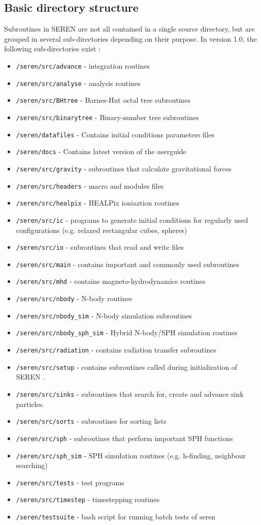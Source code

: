 \documentclass[a4paper]{article}
\newcommand{\var}[1]{\texttt{#1}}
\begin{document}
\subsection{Basic directory structure}
Subroutines in SEREN are not all contained in a single source directory, 
but are grouped in several sub-directories depending on their purpose. 
In version 1.0, the following sub-directories exist : 
\begin{itemize}
\item \var{/seren/src/advance} - integration routines
\item \var{/seren/src/analyse} - analysis routines
\item \var{/seren/src/BHtree} - Barnes-Hut octal tree subroutines
\item \var{/seren/src/binarytree} - Binary-number tree subroutines
\item \var{/seren/datafiles} - Contains initial conditions parameters files
\item \var{/seren/docs} - Contains latest version of the userguide
\item \var{/seren/src/gravity} - subroutines that calculate gravitational forces
\item \var{/seren/src/headers} - macro and modules files
\item \var{/seren/src/healpix} - HEALPix ioniaztion routines
\item \var{/seren/src/ic} - programs to generate initial conditions for 
regularly used configurations (e.g. relaxed rectangular cubes, 
spheres)
\item \var{/seren/src/io} - subroutines that read and write files
\item \var{/seren/src/main} - contains important and commonly used 
subroutines
\item \var{/seren/src/mhd} - contains magneto-hydrodynamics routines
\item \var{/seren/src/nbody} - N-body routines
\item \var{/seren/src/nbody\_sim} - N-body simulation subroutines
\item \var{/seren/src/nbody\_sph\_sim} - Hybrid N-body/SPH simulation routines
\item \var{/seren/src/radiation} - contains radiation transfer subroutines
\item \var{/seren/src/setup} - contains subroutines called during initialization of SEREN .
\item \var{/seren/src/sinks} - subroutines that search for, create and 
advance sink particles. 
\item \var{/seren/src/sorts} - subroutines for sorting lists
\item \var{/seren/src/sph} - subroutines that perform important SPH functions 
\item \var{/seren/src/sph\_sim} - SPH simulation routines
(e.g. h-finding, neighbour searching)  
\item \var{/seren/src/tests} - test programs
\item \var{/seren/src/timestep} - timestepping routines
\item \var{/seren/testsuite} - bash script for running batch tests of seren
\end{itemize}
\end{document}
